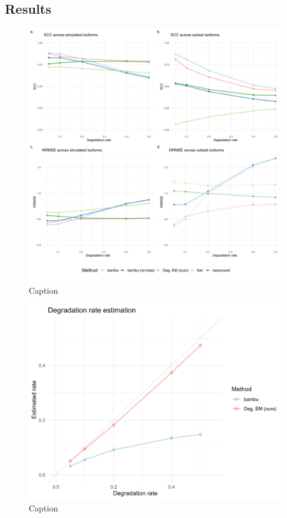 \subsection{Results}

\begin{figure}[H]
    \centering
    \includegraphics[width=\textwidth]{figures/sec-3-scc-nrmse.png}
    \caption{Caption}
    \label{fig:my_label}
\end{figure}

\begin{figure}
    \centering
    \includegraphics[width=\textwidth]{figures/sec-3-deg-est.png}
    \caption{Caption}
    \label{fig:my_label}
\end{figure}